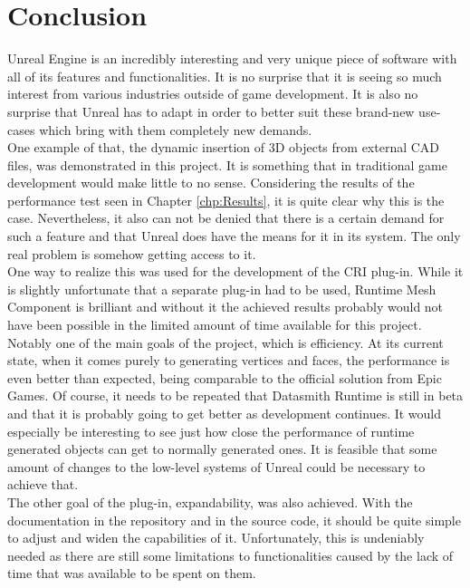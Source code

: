 \chapter{Conclusion}\label{chp:Conclusion}

Unreal Engine is an incredibly interesting and very unique piece of software with all of its features and functionalities. It is no surprise that it is seeing so much interest from various industries outside of game development. It is also no surprise that Unreal has to adapt in order to better suit these brand-new use-cases which bring with them completely new demands.\\
One example of that, the dynamic insertion of 3D objects from external CAD files, was demonstrated in this project. It is something that in traditional game development would make little to no sense. Considering the results of the performance test seen in Chapter \ref{chp:Results}, it is quite clear why this is the case. Nevertheless, it also can not be denied that there is a certain demand for such a feature and that Unreal does have the means for it in its system. The only real problem is somehow getting access to it.\\
One way to realize this was used for the development of the \acs{CRI} plug-in. While it is slightly unfortunate that a separate plug-in had to be used, Runtime Mesh Component is brilliant and without it the achieved results probably would not have been possible in the limited amount of time available for this project. Notably one of the main goals of the project, which is efficiency. At its current state, when it comes purely to generating vertices and faces, the performance is even better than expected, being comparable to the official solution from Epic Games. Of course, it needs to be repeated that Datasmith Runtime is still in beta and that it is probably going to get better as development continues. It would especially be interesting to see just how close the performance of runtime generated objects can get to normally generated ones. It is feasible that some amount of changes to the low-level systems of Unreal could be necessary to achieve that.\\
The other goal of the plug-in, expandability, was also achieved. With the documentation in the repository and in the source code, it should be quite simple to adjust and widen the capabilities of it. Unfortunately, this is undeniably needed as there are still some limitations to functionalities caused by the lack of time that was available to be spent on them.\\
